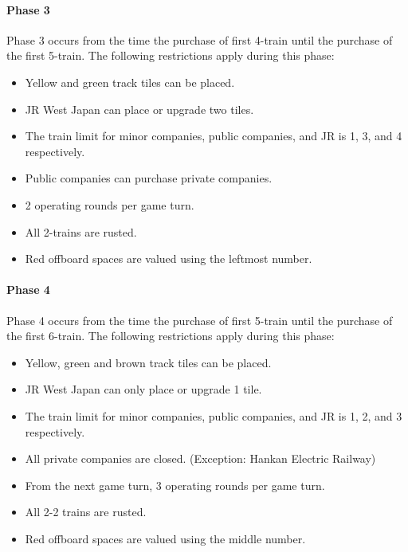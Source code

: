 \documentclass{article}
\begin{document}
\begin{CJK}{UTF8}{min}
\begin{multicols}{2}
\paragraph*{Phase 3}
Phase 3 occurs from the time the purchase of first 4-train until the
purchase of the first 5-train. The following restrictions apply during
this phase:
\begin{itemize}
\item Yellow and green track tiles can be placed.
\item JR West Japan can place or upgrade two tiles.
\item The train limit for minor companies, public companies, and JR is
  1, 3, and 4 respectively.
\item Public companies can purchase private companies.
\item 2 operating rounds per game turn.
\item All 2-trains are rusted.
\item Red offboard spaces are valued using the leftmost number.
\end{itemize}

\paragraph*{Phase 4}
Phase 4 occurs from the time the purchase of first 5-train until the
purchase of the first 6-train. The following restrictions apply during
this phase:
\begin{itemize}
\item Yellow, green and brown track tiles can be placed.
\item JR West Japan can only place or upgrade 1 tile.
\item The train limit for minor companies, public companies, and JR is
  1, 2, and 3 respectively.
\item All private companies are closed. (Exception: Hankan Electric Railway)
\item From the next game turn, 3 operating rounds per game turn.
\item All 2-2 trains are rusted.
\item Red offboard spaces are valued using the middle number.
\end{itemize}


\end{multicols}
\end{CJK}
\end{document}
